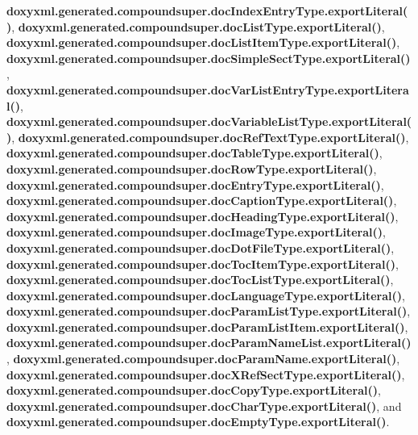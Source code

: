 {\bf doxyxml.\+generated.\+compoundsuper.\+doc\+Index\+Entry\+Type.\+export\+Literal()}, {\bf doxyxml.\+generated.\+compoundsuper.\+doc\+List\+Type.\+export\+Literal()}, {\bf doxyxml.\+generated.\+compoundsuper.\+doc\+List\+Item\+Type.\+export\+Literal()}, {\bf doxyxml.\+generated.\+compoundsuper.\+doc\+Simple\+Sect\+Type.\+export\+Literal()}, {\bf doxyxml.\+generated.\+compoundsuper.\+doc\+Var\+List\+Entry\+Type.\+export\+Literal()}, {\bf doxyxml.\+generated.\+compoundsuper.\+doc\+Variable\+List\+Type.\+export\+Literal()}, {\bf doxyxml.\+generated.\+compoundsuper.\+doc\+Ref\+Text\+Type.\+export\+Literal()}, {\bf doxyxml.\+generated.\+compoundsuper.\+doc\+Table\+Type.\+export\+Literal()}, {\bf doxyxml.\+generated.\+compoundsuper.\+doc\+Row\+Type.\+export\+Literal()}, {\bf doxyxml.\+generated.\+compoundsuper.\+doc\+Entry\+Type.\+export\+Literal()}, {\bf doxyxml.\+generated.\+compoundsuper.\+doc\+Caption\+Type.\+export\+Literal()}, {\bf doxyxml.\+generated.\+compoundsuper.\+doc\+Heading\+Type.\+export\+Literal()}, {\bf doxyxml.\+generated.\+compoundsuper.\+doc\+Image\+Type.\+export\+Literal()}, {\bf doxyxml.\+generated.\+compoundsuper.\+doc\+Dot\+File\+Type.\+export\+Literal()}, {\bf doxyxml.\+generated.\+compoundsuper.\+doc\+Toc\+Item\+Type.\+export\+Literal()}, {\bf doxyxml.\+generated.\+compoundsuper.\+doc\+Toc\+List\+Type.\+export\+Literal()}, {\bf doxyxml.\+generated.\+compoundsuper.\+doc\+Language\+Type.\+export\+Literal()}, {\bf doxyxml.\+generated.\+compoundsuper.\+doc\+Param\+List\+Type.\+export\+Literal()}, {\bf doxyxml.\+generated.\+compoundsuper.\+doc\+Param\+List\+Item.\+export\+Literal()}, {\bf doxyxml.\+generated.\+compoundsuper.\+doc\+Param\+Name\+List.\+export\+Literal()}, {\bf doxyxml.\+generated.\+compoundsuper.\+doc\+Param\+Name.\+export\+Literal()}, {\bf doxyxml.\+generated.\+compoundsuper.\+doc\+X\+Ref\+Sect\+Type.\+export\+Literal()}, {\bf doxyxml.\+generated.\+compoundsuper.\+doc\+Copy\+Type.\+export\+Literal()}, {\bf doxyxml.\+generated.\+compoundsuper.\+doc\+Char\+Type.\+export\+Literal()}, and {\bf doxyxml.\+generated.\+compoundsuper.\+doc\+Empty\+Type.\+export\+Literal()}.



